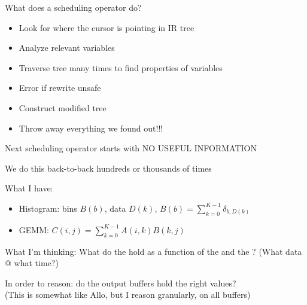 {\LARGE

What does a scheduling operator do?

\begin{itemize}
  \item Look for where the cursor is pointing in IR tree
  \item Analyze relevant variables
  \item Traverse tree many times to find properties of variables
  \item Error if rewrite unsafe
  \item Construct modified tree
  \item Throw away everything we found out!!!
\end{itemize}

\vfill

Next scheduling operator starts with NO USEFUL INFORMATION

\vfill

We do this back-to-back hundreds or thousands of times

\vfill

}

\newpage
{}

{\LARGE

What I have:


\begin{itemize}
    \item Histogram: bins $B(b)$, data $D(k)$, $B(b) = \sum_{k=0}^{K-1} \delta_{b, D(k)}$
    \item GEMM: $C(i, j) = \sum_{k=0}^{K-1} A(i, k) B(k, j)$
\end{itemize}



\vfill

What I'm thinking: What do the  hold as a function of the  and the ?
(What data @ what time?)

\vfill

In order to reason: do the output buffers hold the right values? \\
(This is somewhat like Allo, but I reason granularly, on all buffers)

}

\newpage
{}

{\large

}

